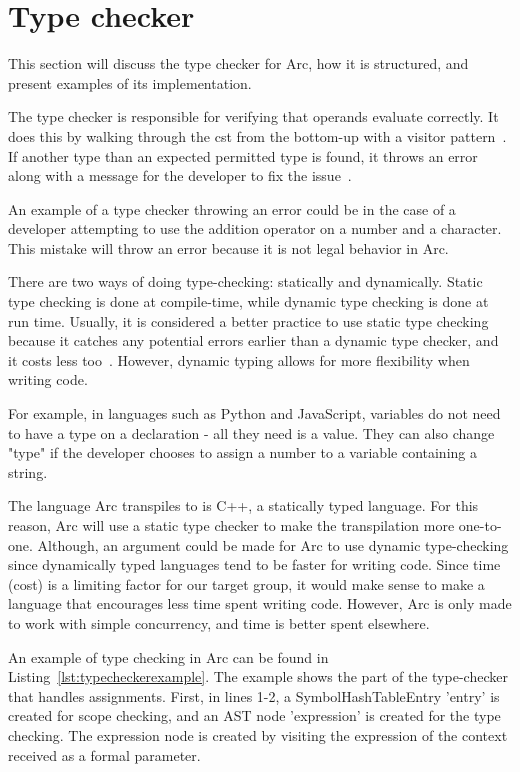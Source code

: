 \section{Type checker}\label{sec:typechecker}
This section will discuss the type checker for Arc, how it is structured, and present examples of its implementation.

The type checker is responsible for verifying that operands evaluate correctly. It does this by walking through the \gls{cst} from the bottom-up with a visitor pattern~\cite{Parr2014}. If another type than an expected permitted type is found, it throws an error along with a message for the developer to fix the issue~\cite{Sebesta2016}.

An example of a type checker throwing an error could be in the case of a developer attempting to use the addition operator on a number and a character. This mistake will throw an error because it is not legal behavior in Arc.

There are two ways of doing type-checking: statically and dynamically. Static type checking is done at compile-time, while dynamic type checking is done at run time. Usually, it is considered a better practice to use static type checking because it catches any potential errors earlier than a dynamic type checker, and it costs less too~\cite{Sebesta2016}. However, dynamic typing allows for more flexibility when writing code.

For example, in languages such as Python and JavaScript, variables do not need to have a type on a declaration - all they need is a value. They can also change "type" if the developer chooses to assign a number to a variable containing a string.

The language Arc transpiles to is C++, a statically typed language. For this reason, Arc will use a static type checker to make the transpilation more one-to-one. Although, an argument could be made for Arc to use dynamic type-checking since dynamically typed languages tend to be faster for writing code. Since time (cost) is a limiting factor for our target group, it would make sense to make a language that encourages less time spent writing code. However, Arc is only made to work with simple concurrency, and time is better spent elsewhere.

An example of type checking in Arc can be found in Listing~\ref{lst:typecheckerexample}. The example shows the part of the type-checker that handles assignments. First, in lines 1-2, a SymbolHashTableEntry 'entry' is created for scope checking, and an AST node 'expression' is created for the type checking. The expression node is created by visiting the expression of the context received as a formal parameter.


